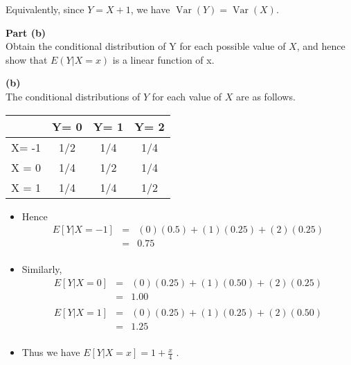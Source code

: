 \documentclass[a4paper,12pt]{article}
\begin{document}
	Equivalently, since $Y = X + 1$, we have $\operatorname{Var}(Y) = \operatorname{Var}(X)$.
	\newpage
	\large
	\begin{framed}
		\noindent \textbf{Part (b)}\\ Obtain the conditional distribution of Y for each possible value of $X$, and hence
		show that $E(Y | X = x)$ is a linear function of x.
	\end{framed}
	
	\noindent \textbf{(b)}\\
	\large
	The conditional distributions of $Y$ for each value of $X$ are as follows.
	\begin{center}
		\begin{tabular}{|c|c|c|c|}\hline 
			& Y= 0    & Y= 1    & Y= 2        \\ \hline \hline 
			X= -1 & 1/2 &  1/4 & 1/4 \\ \hline 
			X = 0 & 1/4 & 1/2 & 1/4 \\ \hline 
			X = 1 & 1/4 & 1/4 & 1/2 \\ \hline 
		\end{tabular}
	\end{center}
	\begin{itemize}
		\item 
		Hence \begin{eqnarray*}E[Y | X = -1] &=& (0)(0.5) + (1)(0.25) + (2)(0.25)\\ &=& 0.75\\
		\end{eqnarray*}
		\item 
		Similarly, 
		\begin{eqnarray*}E[Y | X = 0] &=& (0)(0.25) + (1)(0.50) + (2)(0.25)\\ &=& 1.00\\
		\end{eqnarray*}
		\begin{eqnarray*}E[Y | X = 1] &=& (0)(0.25) + (1)(0.25) + (2)(0.50)\\ &=& 1.25\\
		\end{eqnarray*}
		\item Thus we have $E[Y | X = x] = 1 + \frac{x}{4} $ .
	\end{itemize}
	
	
	
\end{document}
